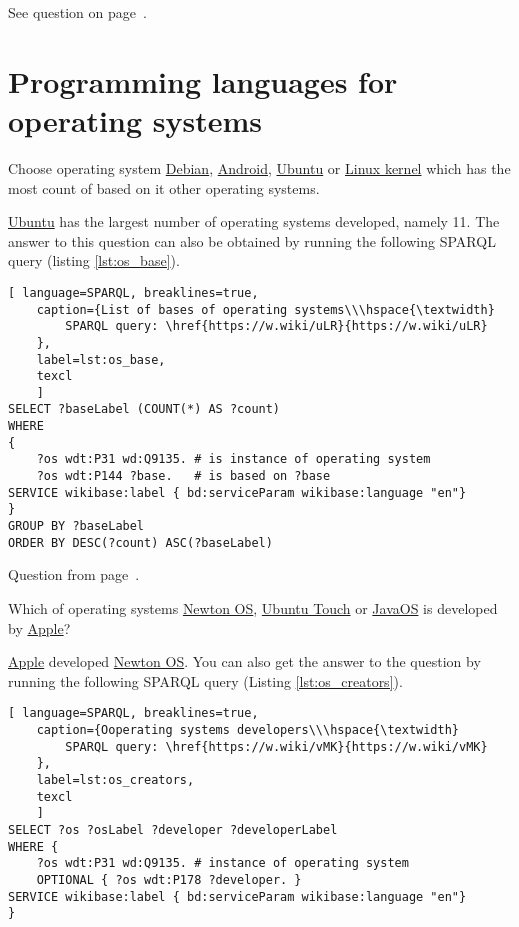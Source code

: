 See question on page~\pageref{question:administrative_territorial}.


\section{Programming languages for operating systems}

\begin{exercise}%
	\label{answer:os_base}
	Choose operating system 
	\href{https://w.wiki/n8U}{Debian},
	\href{https://w.wiki/n8V}{Android},
	\href{https://w.wiki/n8W}{Ubuntu} or
	\href{https://w.wiki/n8X}{Linux kernel}
	which has the most count of based on it other operating systems.	
\end{exercise}

\href{https://w.wiki/n8W}{Ubuntu}  has the largest number of operating systems developed, namely 11. The answer to this question can also be obtained by running the following SPARQL query (listing \ref{lst:os_base}).

\begin{lstlisting}[ language=SPARQL, breaklines=true, 
	caption={List of bases of operating systems\\\hspace{\textwidth}
		SPARQL query: \href{https://w.wiki/uLR}{https://w.wiki/uLR}
	},
	label=lst:os_base,
	texcl 
	]
SELECT ?baseLabel (COUNT(*) AS ?count)
WHERE
{
	?os wdt:P31 wd:Q9135. # is instance of operating system
	?os wdt:P144 ?base.   # is based on ?base
SERVICE wikibase:label { bd:serviceParam wikibase:language "en"}
}
GROUP BY ?baseLabel
ORDER BY DESC(?count) ASC(?baseLabel)
\end{lstlisting}

Question from page~\pageref{lst:base_of_operating_systems}.

\begin{exercise}
	\label{answer:what_system_created}
	Which of operating systems
	\href{https://w.wiki/n8P}{Newton OS},
	\href{https://w.wiki/n8Q}{Ubuntu Touch} or
	\href{https://w.wiki/n8R}{JavaOS} is developed by
	\href{https://w.wiki/n8S}{Apple}?	
\end{exercise}
\href{https://w.wiki/n8S}{Apple}  developed  \href{https://w.wiki/n8P}{Newton OS}. You can also get the answer to the question by running the following SPARQL query (Listing \ref{lst:os_creators}).

\begin{lstlisting}[ language=SPARQL, breaklines=true, 
	caption={Ooperating systems developers\\\hspace{\textwidth}
		SPARQL query: \href{https://w.wiki/vMK}{https://w.wiki/vMK}
	},
	label=lst:os_creators,
	texcl 
	]
SELECT ?os ?osLabel ?developer ?developerLabel 
WHERE {
	?os wdt:P31 wd:Q9135. # instance of operating system
	OPTIONAL { ?os wdt:P178 ?developer. }
SERVICE wikibase:label { bd:serviceParam wikibase:language "en"}
}
\end{lstlisting}


